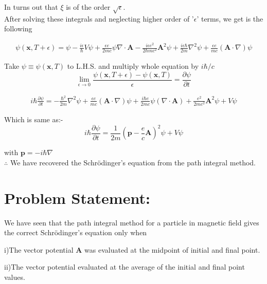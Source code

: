 \documentclass[14pt]{extarticle}
\begin{document}
In turns out that $\xi$ is of the order $\sqrt{\epsilon}$.\\

After solving these integrals and neglecting higher order of '$\epsilon$' terms, we get is the following

\begin{multline}
\psi(\textbf{x},T+\epsilon) = \psi - \frac{i \epsilon}{\hbar} V \psi + \frac{\epsilon e}{2mc} \psi  \nabla \cdot \textbf{A} - \frac{i \epsilon e^2}{2 \hbar mc^2} \textbf{A}^2 \psi + \frac{i \epsilon \hbar}{2m} \nabla^2 \psi + \frac{\epsilon e}{mc} (\textbf{A} \cdot \nabla) \psi \nonumber
\end{multline}


Take $\psi \equiv \psi(\textbf{x},T)$ to L.H.S. and multiply whole equation by $i\hbar/c$\\

$$\lim_{\epsilon \rightarrow 0} \frac{\psi(\textbf{x},T+\epsilon)-\psi(\textbf{x},T)}{\epsilon} =\frac{\partial \psi}{\partial t} $$

\begin{multline}
i\hbar \frac{\partial \psi}{\partial t} = -\frac{\hbar^2}{2m} \nabla^2 \psi + \frac{\epsilon e}{mc} (\textbf{A} \cdot \nabla) \psi + \frac{i \hbar e}{2mc} \psi ( \nabla \cdot \textbf{A}) + \frac{e^2}{2mc^2} \textbf{A}^2 \psi + V \psi \nonumber
\end{multline}

Which is same as:- \\

$$i \hbar \frac{\partial \psi}{\partial t} =\frac{1}{2m} \left( \textbf{p}- \frac{e}{c} \textbf{A} \right)^2  \psi + V \psi $$

with $\textbf{p}= -i \hbar \nabla$\\

$\therefore$ We have recovered the Schrödinger’s equation from the path integral method.

\newpage

\section{Problem Statement:}

We have seen that the path integral method for a particle in magnetic field gives the correct Schrödinger’s equation only when


i)The vector potential $\textbf{A}$ was evaluated at the midpoint of initial and final point.

ii)The vector potential evaluated at the average of the initial and final point values.
\end{document}
